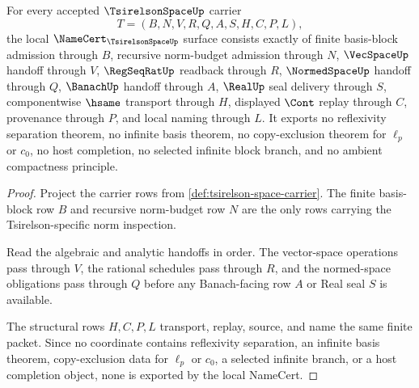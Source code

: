 \begin{theorem}
\label{thm:tsirelson-space-namecert-obligation-surface}
For every accepted $\TsirelsonSpaceUp$ carrier
$$
T=(B,N,V,R,Q,A,S,H,C,P,L),
$$
the local $\NameCert_{\TsirelsonSpaceUp}$ surface consists exactly of finite basis-block admission through $B$, recursive norm-budget admission through $N$, $\VecSpaceUp$ handoff through $V$, $\RegSeqRatUp$ readback through $R$, $\NormedSpaceUp$ handoff through $Q$, $\BanachUp$ handoff through $A$, $\RealUp$ seal delivery through $S$, componentwise $\hsame$ transport through $H$, displayed $\Cont$ replay through $C$, provenance through $P$, and local naming through $L$. It exports no reflexivity separation theorem, no infinite basis theorem, no copy-exclusion theorem for $\ell_p$ or $c_0$, no host completion, no selected infinite block branch, and no ambient compactness principle.
\end{theorem}
\begin{proof}
Project the carrier rows from \autoref{def:tsirelson-space-carrier}. The finite basis-block row $B$ and recursive norm-budget row $N$ are the only rows carrying the Tsirelson-specific norm inspection.

Read the algebraic and analytic handoffs in order. The vector-space operations pass through $V$, the rational schedules pass through $R$, and the normed-space obligations pass through $Q$ before any Banach-facing row $A$ or Real seal $S$ is available.

The structural rows $H,C,P,L$ transport, replay, source, and name the same finite packet. Since no coordinate contains reflexivity separation, an infinite basis theorem, copy-exclusion data for $\ell_p$ or $c_0$, a selected infinite branch, or a host completion object, none is exported by the local NameCert.
\end{proof}

\begin{closurestatus}{\TsirelsonSpaceUp}
  \theoryclosure{\seedClosure}
  \formalstatus{\unformalizedV}
\end{closurestatus}
